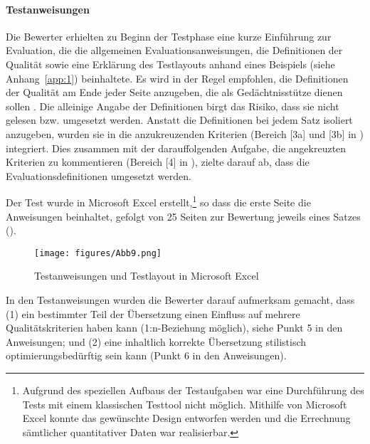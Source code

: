 \paragraph*{Testanweisungen}

Die Bewerter erhielten zu Beginn der Testphase eine kurze Einführung zur Evaluation, die die allgemeinen Evaluationsanweisungen, die Definitionen der Qualität sowie eine Erklärung des Testlayouts anhand eines Beispiels (siehe Anhang~\ref{app:1}) beinhaltete. Es wird in der Regel empfohlen, die Definitionen der Qualität am Ende jeder Seite anzugeben, die als Gedächtnisstütze dienen sollen \citep[193]{Doherty2012}. Die alleinige Angabe der Definitionen birgt das Risiko, dass sie nicht gelesen bzw. umgesetzt werden. Anstatt die Definitionen bei jedem Satz isoliert anzugeben, wurden sie in die anzukreuzenden Kriterien (Bereich [3a] und [3b] in ) integriert. Dies zusammen mit der darauffolgenden Aufgabe, die angekreuzten Kriterien zu kommentieren (Bereich [4] in ), zielte darauf ab, dass die Evaluationsdefinitionen umgesetzt werden.

Der Test wurde in Microsoft Excel erstellt,\footnote{{Aufgrund des speziellen Aufbaus der Testaufgaben war eine Durchführung des Tests mit einem klassischen Testtool nicht möglich. Mithilfe von Microsoft Excel konnte das gewünschte Design entworfen werden und die Errechnung sämtlicher quantitativer Daten war realisierbar.}} so dass die erste Seite die Anweisungen beinhaltet, gefolgt von 25 Seiten zur Bewertung jeweils eines Satzes ().


\begin{figure}
\texttt{[image: figures/Abb9.png]}
\caption{\label{fig:4:9}Testanweisungen und Testlayout in Microsoft Excel}
\end{figure}

In den Testanweisungen wurden die Bewerter darauf aufmerksam gemacht, dass (1) ein bestimmter Teil der Übersetzung einen Einfluss auf mehrere Qualitätskriterien haben kann (1:n-Beziehung möglich), siehe Punkt 5 in den Anweisungen; und (2) eine inhaltlich korrekte Übersetzung stilistisch optimierungsbedürftig sein kann (Punkt 6 in den Anweisungen).

